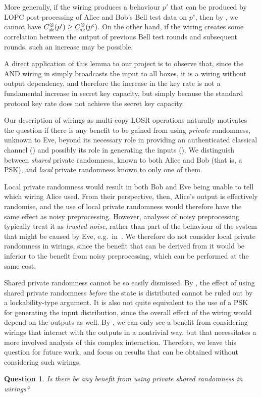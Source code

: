 \documentclass[10pt, a4paper]{article}
\numberwithin{equation}{section} %
\theoremstyle{definition}
\theoremstyle{plain}
\newtheorem{question}{Question}
\newcommand{\?}{\mathrel{?}} %
\newcommand{\sk}{\rm sk}
\begin{document}
    More generally, if the wiring produces a behaviour \(p'\) that can be produced by LOPC post-processing of Alice and Bob's Bell test data on \(p^c\), then by , we cannot have \(C_{\sk}^{\otimes}(p') \geq C_{\sk}^{\otimes}(p^c)\). On the other hand, if the wiring creates some correlation between the output of previous Bell test rounds and subsequent rounds, such an increase may be possible.

    A direct application of this lemma to our project is to observe that, since the AND wiring in  simply broadcasts the input to all boxes, it is a wiring without output dependency, and therefore the increase in the key rate is not a fundamental increase in secret key capacity, but simply because the standard protocol key rate does not achieve the secret key capacity.

    Our description of wirings as multi-copy LOSR operations naturally motivates the question if there is any benefit to be gained from using \emph{private} randomness, unknown to Eve, beyond its necessary role in providing an authenticated classical channel () and possibly its role in generating the inputs (). We distinguish between \emph{shared} private randomness, known to both Alice and Bob (that is, a PSK), and \emph{local} private randomness known to only one of them.

              Local private randomness would result in both Bob and Eve being unable to tell which wiring Alice used. From their perspective, then, Alice's output is effectively randomise, and the use of local private randomness would therefore have the same effect as noisy preprocessing. However, analyses of noisy preprocessing typically treat it as \emph{trusted noise}, rather than part of the behaviour of the system that might be caused by Eve, e.g.\ in~\cite{BFF_QRE, AsymmetricCHSH, DIQKD_FiniteSize}. We therefore do not consider local private randomness in wirings, since the benefit that can be derived from it would be inferior to the benefit from noisy preprocessing, which can be performed at the same cost.

              Shared private randomness cannot be so easily dismissed. By , the effect of using shared private randomness \emph{before} the state is distributed cannot be ruled out by a lockability-type argument. It is also not quite equivalent to the use of a PSK for generating the input distribution, since the overall effect of the wiring would depend on the outputs as well. By , we can only see a benefit from considering wirings that interact with the outputs in a nontrivial way, but that necessitates a more involved analysis of this complex interaction. Therefore, we leave this question for future work, and focus on results that can be obtained without considering such wirings.
              \begin{question}
                Is there be any benefit from using private shared randomness in wirings?
              \end{question}
\end{document}

